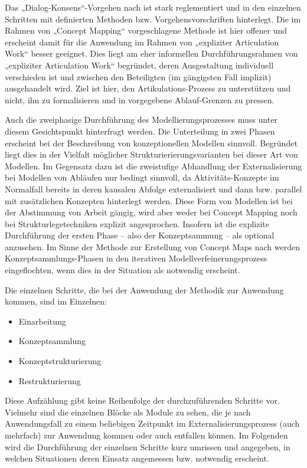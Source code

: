 Das „Dialog-Konsens“-Vorgehen nach \citet{Scheele88} ist stark reglementiert und in den einzelnen Schritten mit definierten Methoden bzw. Vorgehensvorschriften hinterlegt. Die im Rahmen von „Concept Mapping“ vorgeschlagene Methode ist hier offener und erscheint damit für die Anwendung im Rahmen von „expliziter Articulation Work“ besser geeignet. Dies liegt am eher informellen Durchführungsrahmen von „expliziter Articulation Work“ begründet, deren Ausgestaltung individuell verschieden ist und zwischen den Beteiligten (im gängigsten Fall implizit) ausgehandelt wird. Ziel ist hier, den Artikulations-Prozess zu unterstützen und nicht, ihn zu formalisieren und in vorgegebene Ablauf-Grenzen zu pressen. 

Auch die zweiphasige Durchführung des Modellierungsprozesses muss unter diesem Gesichtspunkt hinterfragt werden. Die Unterteilung in zwei Phasen erscheint bei der Beschreibung von konzeptionellen Modellen sinnvoll. Begründet liegt dies in der Vielfalt möglicher Strukturierierungsvarianten bei dieser Art von Modellen. Im Gegensatz dazu ist die zweistufige Abhandlung der Externalisierung bei Modellen von Abläufen nur bedingt sinnvoll, da Aktivitäts-Konzepte im Normalfall bereits in deren kausalen Abfolge externalisiert und dann bzw. parallel mit zusätzlichen Konzepten hinterlegt werden. Diese Form von Modellen ist bei der Abstimmung von Arbeit gängig, wird aber weder bei Concept Mapping noch bei Strukturlegetechniken explizit angesprochen. Insofern ist die explizite Durchführung der ersten Phase -- also der Konzeptsammung -- als optional anzusehen. Im Sinne der Methode zur Erstellung von Concept Maps nach \citep{Novak06} werden Konzeptsammlungs-Phasen in den iterativen Modellverfeinerungsprozess eingeflochten, wenn dies in der Situation als notwendig erscheint.

Die einzelnen Schritte, die bei der Anwendung der Methodik zur Anwendung kommen, sind im Einzelnen:
\begin{itemize}
 \item Einarbeitung
 \item Konzeptsammlung 
 \item Konzeptstrukturierung
 \item Restrukturierung
\end{itemize}

Diese Aufzählung gibt keine Reihenfolge der durchzuführenden Schritte vor. Vielmehr sind die einzelnen Blöcke als Module zu sehen, die je nach Anwendungsfall zu einem beliebigen Zeitpunkt im Externalisierungsprozess (auch mehrfach) zur Anwendung kommen oder auch entfallen können. Im Folgenden wird die Durchführung der einzelnen Schritte kurz umrissen und angegeben, in welchen Situationen deren Einsatz angemessen bzw. notwendig erscheint.


